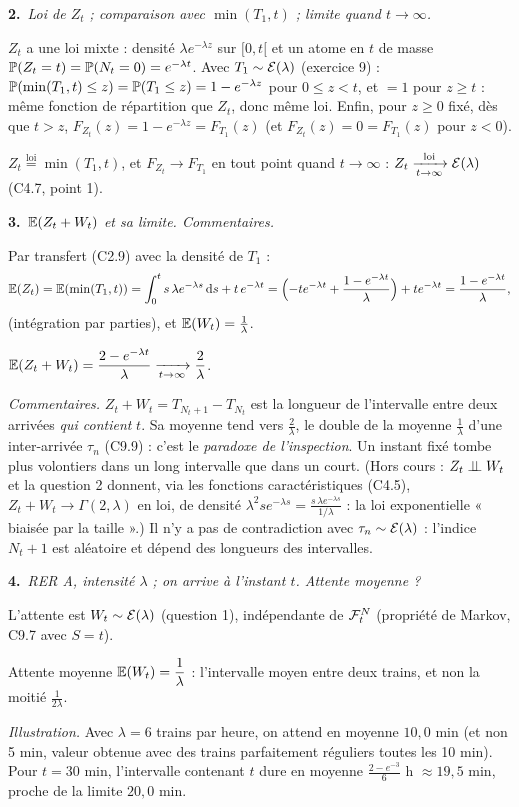 \documentclass[11pt,a4paper]{article}
\newcommand{\question}[2]{\par\medskip\noindent\textbf{#1}~\textit{#2}\par\smallskip}
\begin{document}
\begin{exo}
\question{2.}{Loi de $Z_t$ ; comparaison avec $\min(T_1,t)$ ; limite quand $t\to\infty$.}
$Z_t$ a une loi mixte : densité $\lambda e^{-\lambda z}$ sur $[0,t[$ et un atome en $t$ de masse $\mathbb{P}(Z_t=t)=\mathbb{P}(N_t=0)=e^{-\lambda t}$.
Avec $T_1\sim\mathcal{E}(\lambda)$ (exercice 9) : $\mathbb{P}(\min(T_1,t)\le z)=\mathbb{P}(T_1\le z)=1-e^{-\lambda z}$ pour $0\le z<t$, et $=1$ pour $z\ge t$ :
même fonction de répartition que $Z_t$, donc même loi. Enfin, pour $z\ge0$ fixé, dès que $t>z$, $F_{Z_t}(z)=1-e^{-\lambda z}=F_{T_1}(z)$
(et $F_{Z_t}(z)=0=F_{T_1}(z)$ pour $z<0$).
\begin{resultat}$Z_t\overset{\text{loi}}{=}\min(T_1,t)$, et $F_{Z_t}\to F_{T_1}$ en tout point quand $t\to\infty$ :
$Z_t\xrightarrow[t\to\infty]{\text{loi}}\mathcal{E}(\lambda)$ (C4.7, point 1).\end{resultat}

\question{3.}{$\mathbb{E}(Z_t+W_t)$ et sa limite. Commentaires.}
Par transfert (C2.9) avec la densité de $T_1$ :
\[\mathbb{E}(Z_t)=\mathbb{E}(\min(T_1,t))=\int_0^ts\,\lambda e^{-\lambda s}\,\mathrm{d} s+t\,e^{-\lambda t}=\Bigl(-te^{-\lambda t}+\frac{1-e^{-\lambda t}}\lambda\Bigr)+te^{-\lambda t}
=\frac{1-e^{-\lambda t}}\lambda,\]
(intégration par parties), et $\mathbb{E}(W_t)=\frac1\lambda$.
\begin{resultat}$\mathbb{E}(Z_t+W_t)=\dfrac{2-e^{-\lambda t}}\lambda\xrightarrow[t\to\infty]{}\dfrac2\lambda$.\end{resultat}
\textit{Commentaires.} $Z_t+W_t=T_{N_t+1}-T_{N_t}$ est la longueur de l'intervalle entre deux arrivées \emph{qui contient} $t$. Sa moyenne tend
vers $\frac2\lambda$, le double de la moyenne $\frac1\lambda$ d'une inter-arrivée $\tau_n$ (C9.9) : c'est le \emph{paradoxe de
l'inspection}. Un instant fixé tombe plus volontiers dans un long intervalle que dans un court. (Hors cours : $Z_t\perp\!\!\!\perp W_t$ et la question 2
donnent, via les fonctions caractéristiques (C4.5), $Z_t+W_t\to\Gamma(2,\lambda)$ en loi, de densité $\lambda^2se^{-\lambda s}=\frac{s\,\lambda e^{-\lambda s}}{1/\lambda}$ :
la loi exponentielle « biaisée par la taille ».)
Il n'y a pas de contradiction avec $\tau_n\sim\mathcal{E}(\lambda)$ : l'indice $N_t+1$ est aléatoire et dépend des longueurs des intervalles.

\question{4.}{RER A, intensité $\lambda$ ; on arrive à l'instant $t$. Attente moyenne ?}
L'attente est $W_t\sim\mathcal{E}(\lambda)$ (question 1), indépendante de $\mathcal{F}^N_t$ (propriété de Markov, C9.7 avec $S=t$).
\begin{resultat}Attente moyenne $\mathbb{E}(W_t)=\dfrac1\lambda$ : l'intervalle moyen entre deux trains, et non la moitié $\frac1{2\lambda}$.\end{resultat}
\textit{Illustration.} Avec $\lambda=6$ trains par heure, on attend en moyenne $10{,}0$ min (et non 5 min, valeur obtenue avec des trains
parfaitement réguliers toutes les 10 min). Pour $t=30$ min, l'intervalle contenant $t$ dure en moyenne $\frac{2-e^{-3}}6$ h $\approx19{,}5$ min,
proche de la limite $20{,}0$ min.
\end{exo}
\end{document}
